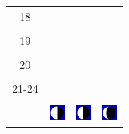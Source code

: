 \documentclass[a4paper,12pt, tikz]{scrartcl}
\begin{document}
\begin{tabularx}{\linewidth}{|c|X|X|X|}
      \hline
      18&   &       &    \\
        &   &       &    \\
      \hline
      19&   &       &    \\
        &   &       &    \\
      \hline
      20&   &       &    \\
        &   &       &    \\
      \hline
      21-24&   &       &    \\
        &   &       &    \\
      \hline  
      & \vspace{0.01cm} \centerline{\includegraphics[width=0.5cm]{moon_phases/Moon_phase_6.svg.png}} \vspace{0.1cm} & \vspace{0.01cm} \centerline{\includegraphics[width=0.5cm]{moon_phases/Moon_phase_6.svg.png}} \vspace{0.1cm} & \vspace{0.01cm} \centerline{\includegraphics[width=0.5cm]{moon_phases/Moon_phase_7.svg.png}} \vspace{0.1cm}\\
      \hline   
    \end{tabularx}




    \newpage

        \noindent
\end{document}

